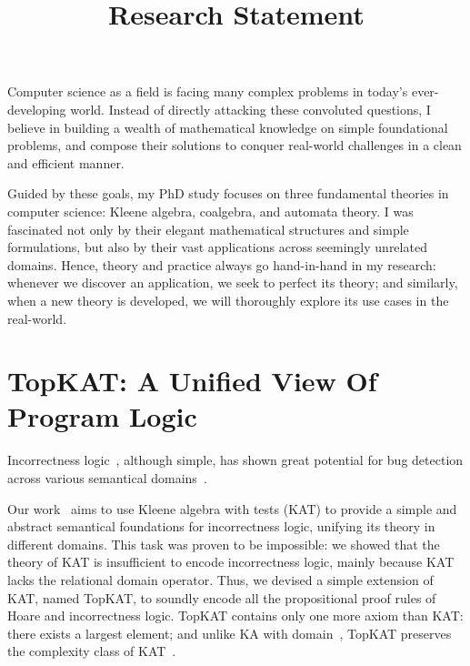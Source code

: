 \documentclass[11pt,a4paper,sans]{moderncv} %
\title{Research Statement}
\begin{document}
\makecvtitle %

\setlength\parskip{8px}

Computer science as a field is facing many complex problems in today's ever-developing world. 
Instead of directly attacking these convoluted questions, I believe in building a wealth of mathematical knowledge on simple foundational problems, and compose their solutions to conquer real-world challenges in a clean and efficient manner. 

Guided by these goals, my PhD study focuses on three fundamental theories in computer science: Kleene algebra, coalgebra, and automata theory. 
I was fascinated not only by their elegant mathematical structures and simple formulations, but also by their vast applications across seemingly unrelated domains. 
Hence, theory and practice always go hand-in-hand in my research: whenever we discover an application, we seek to perfect its theory; and similarly, when a new theory is developed, we will thoroughly explore its use cases in the real-world.

\section{TopKAT: A Unified View Of Program Logic}

Incorrectness logic~\cite{ohearn_IncorrectnessLogic_2020}, although simple, has shown great potential for bug detection across various semantical domains~\cite{raad_LocalReasoningPresence_2020,le_FindingRealBugs_2022, zhang_QuantitativeStrongestPost_2022b}.

Our work~\cite{zhang_IncorrectnessLogicKleene_2022} aims to use Kleene algebra with tests (KAT) to provide a simple and abstract semantical foundations for incorrectness logic, unifying its theory in different domains. 
This task was proven to be impossible: we showed that the theory of KAT is insufficient to encode incorrectness logic, mainly because KAT lacks the relational domain operator.
Thus, we devised a simple extension of KAT, named TopKAT, to soundly encode all the propositional proof rules of Hoare and incorrectness logic. 
TopKAT contains only one more axiom than KAT: there exists a largest element; and unlike KA with domain~\cite{sedlar_ComplexityKleeneAlgebra_2023}, TopKAT preserves the complexity class of KAT~\cite{zhang_IncorrectnessLogicKleene_2022}.
\end{document}
